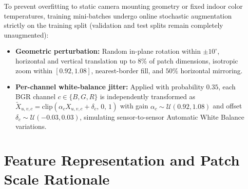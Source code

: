 To prevent overfitting to static camera mounting geometry or fixed indoor color temperatures, training mini-batches undergo online stochastic augmentation strictly on the training split (validation and test splits remain completely unaugmented):
\begin{itemize}
    \item \textbf{Geometric perturbation:} Random in-plane rotation within $\pm 10^\circ$, horizontal and vertical translation up to $8\%$ of patch dimensions, isotropic zoom within $[0.92, 1.08]$, nearest-border fill, and $50\%$ horizontal mirroring.
    \item \textbf{Per-channel white-balance jitter:} Applied with probability $0.35$, each BGR channel $c \in \{B, G, R\}$ is independently transformed as $\tilde{X}_{u,v,c} = \text{clip}(\alpha_c X_{u,v,c} + \delta_c,\, 0,\, 1)$ with gain $\alpha_c \sim \mathcal{U}(0.92, 1.08)$ and offset $\delta_c \sim \mathcal{U}(-0.03, 0.03)$, simulating sensor-to-sensor Automatic White Balance variations.
\end{itemize}

\section{Feature Representation and Patch Scale Rationale}
\label{sec:feature_extraction}

